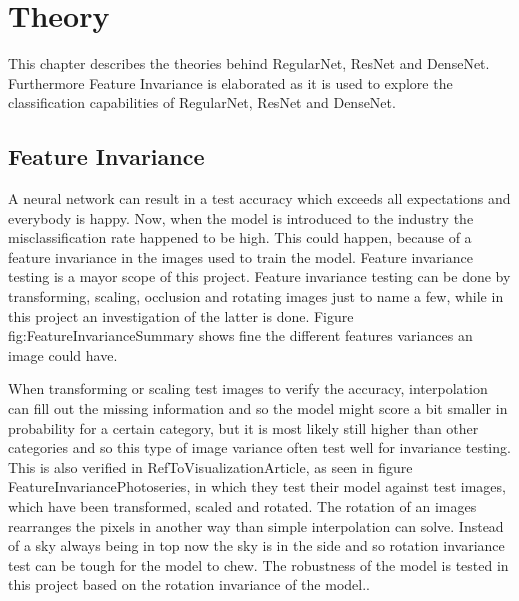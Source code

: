\chapter{Theory}
\label{chp:theory}

This chapter describes the theories behind RegularNet, ResNet and DenseNet. Furthermore Feature Invariance is elaborated as it is used to explore the classification capabilities of RegularNet, ResNet and DenseNet.

\section{Feature Invariance}
A neural network can result in a test accuracy which exceeds all expectations and everybody is happy. Now, when the model is introduced to the industry the misclassification rate happened to be high. This could happen, because of a feature invariance in the images used to train the model. Feature invariance testing is a mayor scope of this project. Feature invariance testing can be done by transforming, scaling, occlusion and rotating images just to name a few, while in this project an investigation of the latter is done. Figure fig:FeatureInvarianceSummary shows fine the different features variances an image could have.

\FloatBarrier

When transforming or scaling test images to verify the accuracy, interpolation can fill out the missing information and so the model might score a bit smaller in probability for a certain category, but it is most likely still higher than other categories and so this type of image variance often test well for invariance testing. This is also verified in RefToVisualizationArticle, as seen in figure FeatureInvariancePhotoseries, in which they test their model against test images, which have been transformed, scaled and rotated. The rotation of an images rearranges the pixels in another way than simple interpolation can solve. Instead of a sky always being in top now the sky is in the side and so rotation invariance test can be tough for the model to chew. The robustness of the model is tested in this project based on the rotation invariance of the model..

\FloatBarrier






